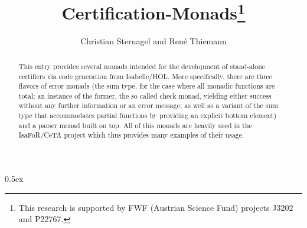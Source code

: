 \documentclass[11pt,a4paper]{article}
\begin{document}
\title{Certification-Monads\thanks{This research is supported by FWF (Austrian Science Fund) projects J3202 and P22767.}}
\author{Christian Sternagel and Ren\'e Thiemann}
\maketitle

\begin{abstract}
This entry provides several monads intended for the development of stand-alone
certifiers via code generation from Isabelle/HOL. More specifically, there are
three flavors of error monads (the sum type, for the case where all monadic
functions are total; an instance of the former, the so called check monad,
yielding either success without any further information or an error message; as
well as a variant of the sum type that accommodates partial functions by
providing an explicit bottom element) and a parser monad built on top. All of
this monads are heavily used in the IsaFoR/CeTA project which thus provides many
examples of their usage. 
\end{abstract}

\tableofcontents

\parindent 0pt\parskip 0.5ex


\end{document}
